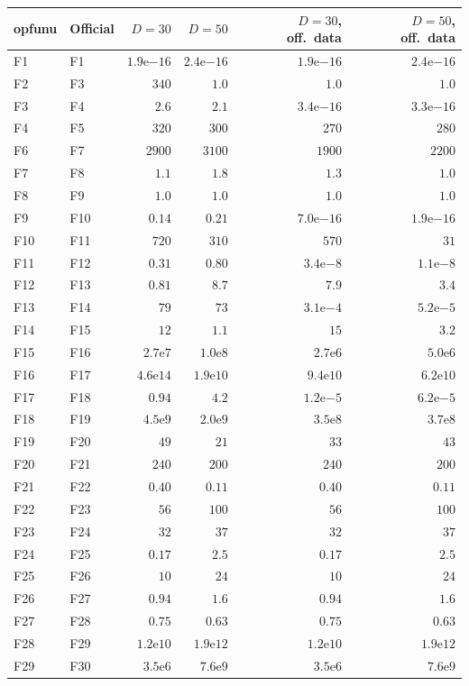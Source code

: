 \begin{tabular}{llrrrr}
\toprule
opfunu & Official & $D=30$ & $D=50$ & $D=30$, off.\ data & $D=50$, off.\ data \\
\midrule
F1 & F1 & $1.9\mathrm{e}{-16}$ & $2.4\mathrm{e}{-16}$ & $1.9\mathrm{e}{-16}$ & $2.4\mathrm{e}{-16}$ \\
F2 & F3 & $340$ & $1.0$ & $1.0$ & $1.0$ \\
F3 & F4 & $2.6$ & $2.1$ & $3.4\mathrm{e}{-16}$ & $3.3\mathrm{e}{-16}$ \\
F4 & F5 & $320$ & $300$ & $270$ & $280$ \\
F6 & F7 & $2900$ & $3100$ & $1900$ & $2200$ \\
F7 & F8 & $1.1$ & $1.8$ & $1.3$ & $1.0$ \\
F8 & F9 & $1.0$ & $1.0$ & $1.0$ & $1.0$ \\
F9 & F10 & $0.14$ & $0.21$ & $7.0\mathrm{e}{-16}$ & $1.9\mathrm{e}{-16}$ \\
F10 & F11 & $720$ & $310$ & $570$ & $31$ \\
F11 & F12 & $0.31$ & $0.80$ & $3.4\mathrm{e}{-8}$ & $1.1\mathrm{e}{-8}$ \\
F12 & F13 & $0.81$ & $8.7$ & $7.9$ & $3.4$ \\
F13 & F14 & $79$ & $73$ & $3.1\mathrm{e}{-4}$ & $5.2\mathrm{e}{-5}$ \\
F14 & F15 & $12$ & $1.1$ & $15$ & $3.2$ \\
F15 & F16 & $2.7\mathrm{e}{7}$ & $1.0\mathrm{e}{8}$ & $2.7\mathrm{e}{6}$ & $5.0\mathrm{e}{6}$ \\
F16 & F17 & $4.6\mathrm{e}{14}$ & $1.9\mathrm{e}{10}$ & $9.4\mathrm{e}{10}$ & $6.2\mathrm{e}{10}$ \\
F17 & F18 & $0.94$ & $4.2$ & $1.2\mathrm{e}{-5}$ & $6.2\mathrm{e}{-5}$ \\
F18 & F19 & $4.5\mathrm{e}{9}$ & $2.0\mathrm{e}{9}$ & $3.5\mathrm{e}{8}$ & $3.7\mathrm{e}{8}$ \\
F19 & F20 & $49$ & $21$ & $33$ & $43$ \\
F20 & F21 & $240$ & $200$ & $240$ & $200$ \\
F21 & F22 & $0.40$ & $0.11$ & $0.40$ & $0.11$ \\
F22 & F23 & $56$ & $100$ & $56$ & $100$ \\
F23 & F24 & $32$ & $37$ & $32$ & $37$ \\
F24 & F25 & $0.17$ & $2.5$ & $0.17$ & $2.5$ \\
F25 & F26 & $10$ & $24$ & $10$ & $24$ \\
F26 & F27 & $0.94$ & $1.6$ & $0.94$ & $1.6$ \\
F27 & F28 & $0.75$ & $0.63$ & $0.75$ & $0.63$ \\
F28 & F29 & $1.2\mathrm{e}{10}$ & $1.9\mathrm{e}{12}$ & $1.2\mathrm{e}{10}$ & $1.9\mathrm{e}{12}$ \\
F29 & F30 & $3.5\mathrm{e}{6}$ & $7.6\mathrm{e}{9}$ & $3.5\mathrm{e}{6}$ & $7.6\mathrm{e}{9}$ \\
\bottomrule
\end{tabular}
